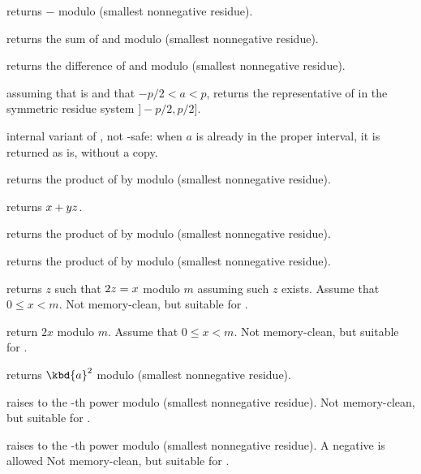  returns $-$ modulo  (smallest
nonnegative residue).

 returns the sum of  and
 modulo  (smallest nonnegative residue).

 returns the difference of  and
 modulo  (smallest nonnegative residue).

 assuming that  is
 and that $-p/2 < a < p$, returns the representative of
 in the symmetric residue system $]-p/2,p/2]$.

 internal variant of
, not -safe: when $a$ is already in the
proper interval, it is returned as is, without a copy.

 returns the product of  by
 modulo  (smallest nonnegative residue).

 returns $x + y\*z$.

 returns the product of  by
 modulo  (smallest nonnegative residue).

 returns the product of  by
 modulo  (smallest nonnegative residue).

 returns $z$ such that $2\*z = x$ modulo
$m$ assuming such $z$ exists. Assume that $0 \leq x < m$. Not memory-clean,
but suitable for .

 return $2x$ modulo $m$. Assume that $0
\leq x < m$. Not memory-clean, but suitable for .

 returns $\kbd{a}^2$ modulo  (smallest
nonnegative residue).

 raises  to the -th
power modulo  (smallest nonnegative residue). Not memory-clean, but
suitable for .

 raises  to the -th
power modulo  (smallest nonnegative residue). A negative  is
allowed Not memory-clean, but suitable for .

